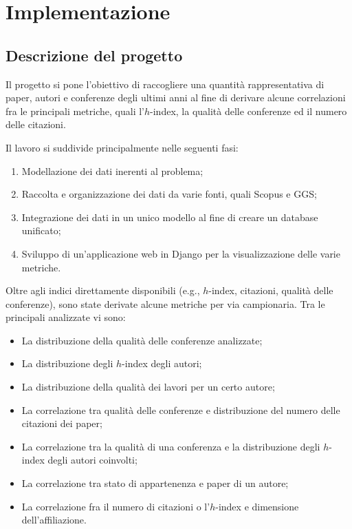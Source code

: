 \chapter{Implementazione}

\section{Descrizione del progetto}
\label{descrizione_progetto}

Il progetto si pone l'obiettivo di raccogliere una quantità rappresentativa
di paper, autori e conferenze degli ultimi anni al fine di derivare alcune
correlazioni fra le principali metriche, quali l'$h$-index, la qualità delle
conferenze ed il numero delle citazioni.

Il lavoro si suddivide principalmente nelle seguenti fasi:
\begin{enumerate}
  \item Modellazione dei dati inerenti al problema;
  \item Raccolta e organizzazione dei dati da varie fonti, quali Scopus e GGS;
  \item Integrazione dei dati in un unico modello al fine di creare un database unificato;
  \item Sviluppo di un'applicazione web in Django per la visualizzazione delle varie metriche.
\end{enumerate}

Oltre agli indici direttamente disponibili (e.g., $h$-index, citazioni, qualità
delle conferenze), sono state derivate alcune metriche per via campionaria.
Tra le principali analizzate vi sono:
\begin{itemize}
  \item La distribuzione della qualità delle conferenze analizzate;
  \item La distribuzione degli $h$-index degli autori;
  \item La distribuzione della qualità dei lavori per un certo autore;
  \item La correlazione tra qualità delle conferenze e distribuzione del numero delle citazioni dei paper;
  \item La correlazione tra la qualità di una conferenza e la distribuzione degli $h$-index degli autori coinvolti;
  \item La correlazione tra stato di appartenenza e paper di un autore;
  \item La correlazione fra il numero di citazioni o l'$h$-index e dimensione dell'affiliazione.
\end{itemize}

